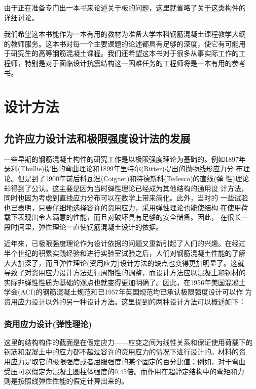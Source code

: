 \documentclass[12pt,a4paper]{book}
\begin{document}
由于正在准备专门出一本书来论述关于板的问题，这里就省略了关于这类构件的
详细讨论。

我们希望这本书能作为一本有用的教材为准备大学本科钢筋混凝土课程教学大纲
的教师服务。这本书对每一个主要课题的论述都具有足够的深度，使它有可能用
于研究生的高等钢筋混凝土课程。我们还希望这本书对于很多从事实际工作的工
程师，特别是对于面临设计抗震结构这一困难任务的工程师将是一本有用的参考
书。

\tableofcontents

\chapter{设计方法}

\section{允许应力设计法和极限强度设计法的发展}

一些早期的钢筋混凝土构件的研究工作是以极限强度理论为基础的。例如1897年
瑟利(Thullie)提出的弯曲理论和1899年里特尔(Ritter)提出的抛物线形应力分
布理论。但是到了1900年前后科瓦涅(Coignet)和特德斯科(Tedesco)的直线(弹
性)理论却得到了公认。这主要是因为当时弹性理论已经成为其他结构的通用设
计方法，同时也因为考虑到直线应力分布可以在数学上带来简化。此外，当时的
一些试验也已表明，只要仔细地选择容许的资用应力，采用弹性理论也能使结构
在使用荷载下表现出令人满意的性能，而且对破坏具有足够的安全储备。因此，
在很长一段时间里，弹性理论一直使钢筋混凝土设计的依据。

近年来，已极限强度理论作为设计依据的问题又重新引起了人们的兴趣。在经过
半个世纪的积累实践经验和进行实验室试验之后，人们对钢筋混凝土性能的了解
大大加深了，而且弹性理论(资用应力)设计方法的缺点也变得更加明显了。这就
导致了对资用应力设计方法进行周期性的调整，而设计方法应以混凝土和钢材的
实际非弹性性质为基础的观点也就变得更加明确了。因此，在1956年美国混凝土
学会(ACI)的钢筋混凝土规范和已1957年英国规范均已承认极限强度设计可以作
为资用应力设计以外的另一种设计方法。这里提到的两种设计方法可以概述如下：

\subsection{资用应力设计(弹性理论)}

这里的结构构件的截面是在假定应力——应变之间为线性关系和保证使用荷载下的
钢筋和混凝土中的应力都不超过容许的资用应力的情况下进行设计的。材料的资
用应力是取它的极限强度或者屈服强度的某个固定的百分比值；例如，对于弯曲
受压可以假定为混凝土圆柱体强度的0.45倍。而作用在超静定结构中的弯矩和力
则是按照线弹性性能的假定计算出来的。
\end{document}
